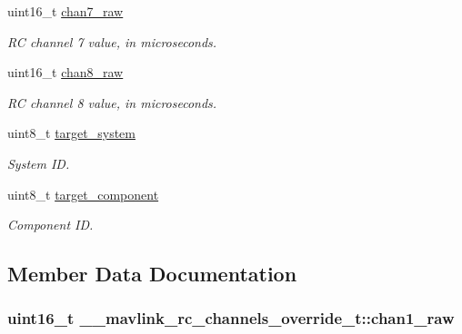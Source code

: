 \begin{DoxyCompactItemize}
uint16\+\_\+t \hyperlink{struct____mavlink__rc__channels__override__t_a0380add4a72cd924a6ac61d1504dad82}{chan7\+\_\+raw}
\begin{DoxyCompactList}\small\item\em R\+C channel 7 value, in microseconds. \end{DoxyCompactList}\item 
uint16\+\_\+t \hyperlink{struct____mavlink__rc__channels__override__t_a8028c42950c16d10f196f35df6d32404}{chan8\+\_\+raw}
\begin{DoxyCompactList}\small\item\em R\+C channel 8 value, in microseconds. \end{DoxyCompactList}\item 
\hypertarget{struct____mavlink__rc__channels__override__t_a0c5393c94e6462a75244ad5083f310f8}{uint8\+\_\+t \hyperlink{struct____mavlink__rc__channels__override__t_a0c5393c94e6462a75244ad5083f310f8}{target\+\_\+system}}\label{struct____mavlink__rc__channels__override__t_a0c5393c94e6462a75244ad5083f310f8}

\begin{DoxyCompactList}\small\item\em System I\+D. \end{DoxyCompactList}\item 
\hypertarget{struct____mavlink__rc__channels__override__t_af53aa3ccd48e674dd69ad102616b4045}{uint8\+\_\+t \hyperlink{struct____mavlink__rc__channels__override__t_af53aa3ccd48e674dd69ad102616b4045}{target\+\_\+component}}\label{struct____mavlink__rc__channels__override__t_af53aa3ccd48e674dd69ad102616b4045}

\begin{DoxyCompactList}\small\item\em Component I\+D. \end{DoxyCompactList}\end{DoxyCompactItemize}


\subsection{Member Data Documentation}
\hypertarget{struct____mavlink__rc__channels__override__t_aeb8348ef82cccce6d514fdf1d2a4d216}{
\subsubsection[{chan1\+\_\+raw}]{\setlength{\rightskip}{0pt plus 5cm}uint16\+\_\+t \+\_\+\+\_\+mavlink\+\_\+rc\+\_\+channels\+\_\+override\+\_\+t\+::chan1\+\_\+raw}}\label{struct____mavlink__rc__channels__override__t_aeb8348ef82cccce6d514fdf1d2a4d216}


